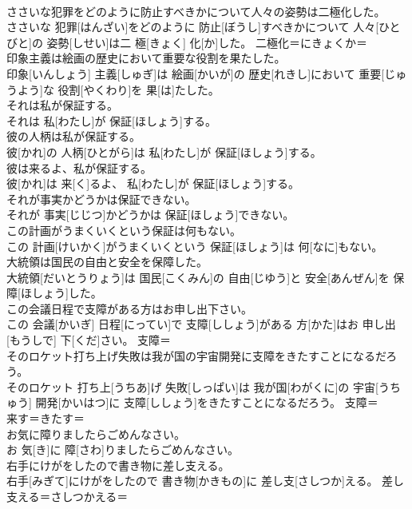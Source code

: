 \documentclass[8pt]{extreport}
\begin{document}
\begin{CJK}{UTF8}{min}
\\	ささいな犯罪をどのように防止すべきかについて人々の姿勢は二極化した。	
\\	ささいな 犯罪[はんざい]をどのように 防止[ぼうし]すべきかについて 人々[ひとびと]の 姿勢[しせい]は二 極[きょく] 化[か]した。	二極化＝にきょくか＝ 
\\	印象主義は絵画の歴史において重要な役割を果たした。	
\\	印象[いんしょう] 主義[しゅぎ]は 絵画[かいが]の 歴史[れきし]において 重要[じゅうよう]な 役割[やくわり]を 果[は]たした。	
\\	それは私が保証する。	
\\	それは 私[わたし]が 保証[ほしょう]する。	
\\	彼の人柄は私が保証する。	
\\	彼[かれ]の 人柄[ひとがら]は 私[わたし]が 保証[ほしょう]する。	
\\	彼は来るよ、私が保証する。	
\\	彼[かれ]は 来[く]るよ、 私[わたし]が 保証[ほしょう]する。	
\\	それが事実かどうかは保証できない。	
\\	それが 事実[じじつ]かどうかは 保証[ほしょう]できない。	
\\	この計画がうまくいくという保証は何もない。	
\\	この 計画[けいかく]がうまくいくという 保証[ほしょう]は 何[なに]もない。	
\\	大統領は国民の自由と安全を保障した。	
\\	大統領[だいとうりょう]は 国民[こくみん]の 自由[じゆう]と 安全[あんぜん]を 保障[ほしょう]した。	
\\	この会議日程で支障がある方はお申し出下さい。	
\\	この 会議[かいぎ] 日程[にってい]で 支障[ししょう]がある 方[かた]はお 申し出[もうしで] 下[くだ]さい。	支障＝ 
\\	そのロケット打ち上げ失敗は我が国の宇宙開発に支障をきたすことになるだろう。	
\\	そのロケット 打ち上[うちあ]げ 失敗[しっぱい]は 我が国[わがくに]の 宇宙[うちゅう] 開発[かいはつ]に 支障[ししょう]をきたすことになるだろう。	支障＝ 
\\	来す＝きたす＝ 
\\	お気に障りましたらごめんなさい。	
\\	お 気[き]に 障[さわ]りましたらごめんなさい。	
\\	右手にけがをしたので書き物に差し支える。	
\\	右手[みぎて]にけがをしたので 書き物[かきもの]に 差し支[さしつか]える。	差し支える＝さしつかえる＝ 

\end{CJK}
\end{document}
